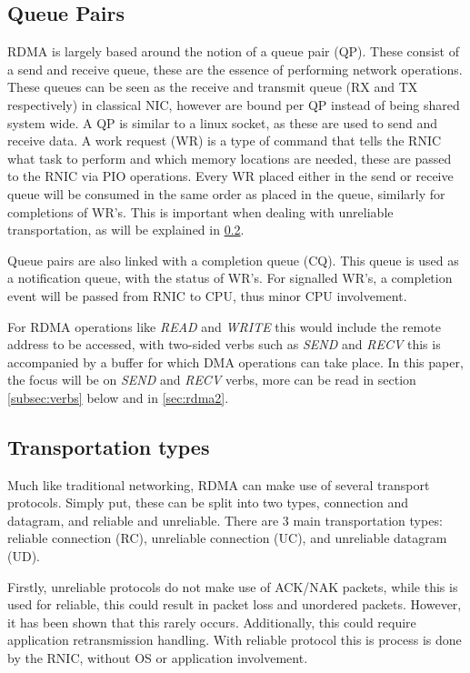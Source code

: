 \subsection{Queue Pairs}\label{subsec:queue-pairs}
RDMA is largely based around the notion of a queue pair (QP).
These consist of a send and receive queue, these are the essence of performing network operations.
These queues can be seen as the receive and transmit queue (RX and TX respectively) in classical NIC, however are bound per QP instead of being shared system wide.
A QP is similar to a linux socket, as these are used to send and receive data.
A work request (WR) is a type of command that tells the RNIC what task to perform and which memory locations are needed, these are passed to the RNIC via PIO operations.
Every WR placed either in the send or receive queue will be consumed in the same order as placed in the queue, similarly for completions of WR's.
This is important when dealing with unreliable transportation, as will be explained in \ref{subsec:transportation-types}.

Queue pairs are also linked with a completion queue (CQ).
This queue is used as a notification queue, with the status of WR's.
For signalled WR's, a completion event will be passed from RNIC to CPU, thus minor CPU involvement.


For RDMA operations like \textit{READ} and \textit{WRITE} this would include the remote address to be accessed, with two-sided verbs such as \textit{SEND} and \textit{RECV} this is accompanied by a buffer for which DMA operations can take place.
In this paper, the focus will be on \textit{SEND} and \textit{RECV} verbs, more can be read in section \ref{subsec:verbs} below and in \ref{sec:rdma2}.

\subsection{Transportation types}\label{subsec:transportation-types}
Much like traditional networking, RDMA can make use of several transport protocols.
Simply put, these can be split into two types, connection and datagram, and reliable and unreliable.
There are 3 main transportation types: reliable connection (RC), unreliable connection (UC), and unreliable datagram (UD).

Firstly, unreliable protocols do not make use of ACK/NAK packets, while this is used for reliable, this could result in packet loss and unordered packets.
However, it has been shown that this rarely occurs\cite{kalia2014using, kalia2016fasst}.
Additionally, this could require application retransmission handling.
With reliable protocol this is process is done by the RNIC, without OS or application involvement.

